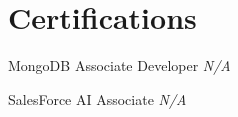 \documentclass[a4paper,10pt]{article}
\begin{document}

\section*{Certifications}
\noindent
\begin{compactitem}
    
        \item MongoDB Associate Developer \hfill \textit{ N/A }
    
        \item SalesForce AI Associate \hfill \textit{ N/A }
    
\end{compactitem}
\end{document}
